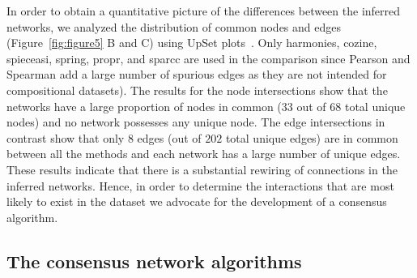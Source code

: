   In order to obtain a quantitative picture of the differences between the inferred networks, we analyzed the distribution of common nodes and edges (Figure~\ref{fig:figure5} B and C) using UpSet plots~\cite{Lex}.
  Only \ac{harmonies}, \ac{cozine}, \ac{spieceasi}, \ac{spring}, propr, and \ac{sparcc} are used in the comparison since Pearson and Spearman add a large number of spurious edges as they are not intended for compositional datasets).
  The results for the node intersections show that the networks have a large proportion of nodes in common ($33$ out of $68$ total unique nodes) and no network possesses any unique node.
  The edge intersections in contrast show that only $8$ edges (out of $202$ total unique edges) are in common between all the methods and each network has a large number of unique edges.
  These results indicate that there is a substantial rewiring of connections in the inferred networks.
  Hence, in order to determine the interactions that are most likely to exist in the dataset we advocate for the development of a consensus algorithm.

  \FloatBarrier

  \subsection*{The consensus network algorithms}

